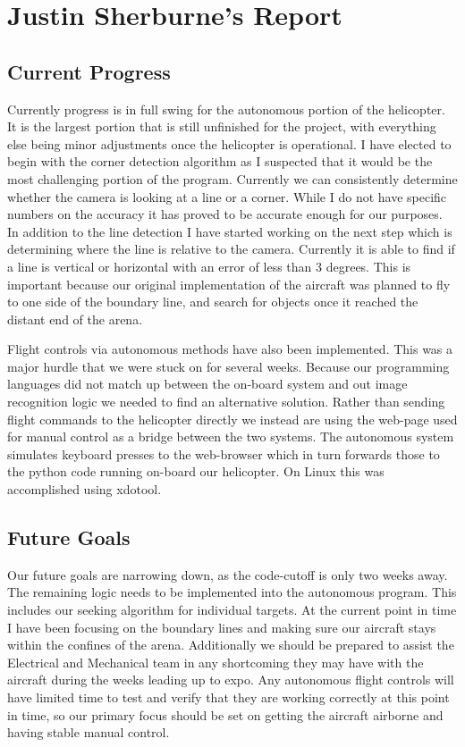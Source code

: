 \documentclass[onecolumn, draftclsnofoot,10pt, compsoc]{IEEEtran}
\begin{document}
\section{Justin Sherburne's Report}

\subsection{Current Progress}

Currently progress is in full swing for the autonomous portion of the helicopter. It is the largest portion that is still unfinished for the project, with everything else being minor adjustments once the helicopter is operational. I have elected to begin with the corner detection algorithm as I suspected that it would be the most challenging portion of the program. Currently we can consistently determine whether the camera is looking at a line or a corner. While I do not have specific numbers on the accuracy it has proved to be accurate enough for our purposes. In addition to the line detection I have started working on the next step which is determining where the line is relative to the camera. Currently it is able to find if a line is vertical or horizontal with an error of less than 3 degrees. This is important because our original implementation of the aircraft was planned to fly to one side of the boundary line, and search for objects once it reached the distant end of the arena. 

Flight controls via autonomous methods have also been implemented. This was a major hurdle that we were stuck on for several weeks. Because our programming languages did not match up between the on-board system and out image recognition logic we needed to find an alternative solution. Rather than sending flight commands to the helicopter directly we instead are using the web-page used for manual control as a bridge between the two systems. The autonomous system simulates keyboard presses to the web-browser which in turn forwards those to the python code running on-board our helicopter. On Linux this was accomplished using xdotool. 

\subsection{Future Goals}

Our future goals are narrowing down, as the code-cutoff is only two weeks away. The remaining logic needs to be implemented into the autonomous program. This includes our seeking algorithm for individual targets. At the current point in time I have been focusing on the boundary lines and making sure our aircraft stays within the confines of the arena. Additionally we should be prepared to assist the Electrical and Mechanical team in any shortcoming they may have with the aircraft during the weeks leading up to expo. Any autonomous flight controls will have limited time to test and verify that they are working correctly at this point in time, so our primary focus should be set on getting the aircraft airborne and having stable manual control. 
\end{document}
